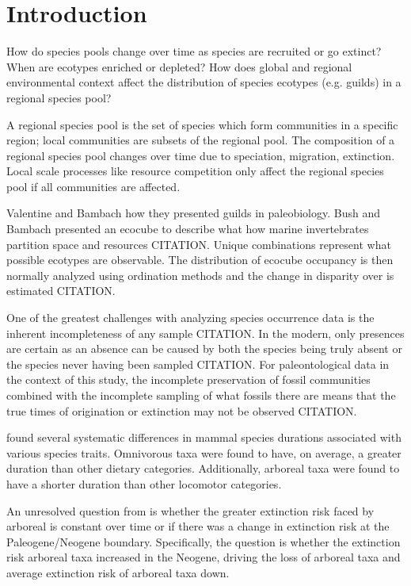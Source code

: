 \documentclass[12pt,letterpaper]{article}
\begin{document}
\section*{Introduction}


How do species pools change over time as species are recruited or go extinct? When are ecotypes enriched or depleted? How does global and regional environmental context affect the distribution of species ecotypes (e.g. guilds) in a regional species pool?

A regional species pool is the set of species which form communities in a specific region; local communities are subsets of the regional pool. The composition of a regional species pool changes over time due to speciation, migration, extinction. Local scale processes like resource competition only affect the regional species pool if all communities are affected.

Valentine and Bambach how they presented guilds in paleobiology. Bush and Bambach presented an ecocube to describe what how marine invertebrates partition space and resources CITATION. Unique combinations represent what possible ecotypes are observable. The distribution of ecocube occupancy is then normally analyzed using ordination methods and the change in disparity over is estimated CITATION.


One of the greatest challenges with analyzing species occurrence data is the inherent incompleteness of any sample CITATION. In the modern, only presences are certain as an absence can be caused by both the species being truly absent or the species never having been sampled CITATION. For paleontological data in the context of this study, the incomplete preservation of fossil communities combined with the incomplete sampling of what fossils there are means that the true times of origination or extinction may not be observed CITATION.

\citet{Smits2015} found several systematic differences in mammal species durations associated with various species traits. Omnivorous taxa were found to have, on average, a greater duration than other dietary categories. Additionally, arboreal taxa were found to have a shorter duration than other locomotor categories. 

An unresolved question from \citet{Smits2015} is whether the greater extinction risk faced by arboreal is constant over time or if there was a change in extinction risk at the Paleogene/Neogene boundary. Specifically, the question is whether the extinction risk arboreal taxa increased in the Neogene, driving the loss of arboreal taxa and average extinction risk of arboreal taxa down. 
\end{document}

